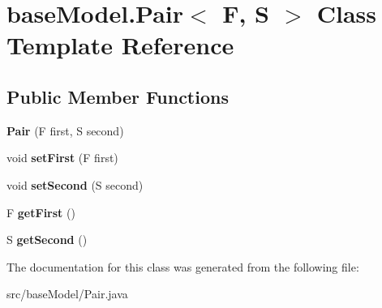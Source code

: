 \hypertarget{classbase_model_1_1_pair}{}\section{base\+Model.\+Pair$<$ F, S $>$ Class Template Reference}
\label{classbase_model_1_1_pair}
\subsection*{Public Member Functions}
\begin{DoxyCompactItemize}
\item 
\hypertarget{classbase_model_1_1_pair_ae46c67c9ec3ecc2b320ec0e24e7f7a21}{}{\bfseries Pair} (F first, S second)\label{classbase_model_1_1_pair_ae46c67c9ec3ecc2b320ec0e24e7f7a21}

\item 
\hypertarget{classbase_model_1_1_pair_a127283b1a2552b95a2cdcdd59161f360}{}void {\bfseries set\+First} (F first)\label{classbase_model_1_1_pair_a127283b1a2552b95a2cdcdd59161f360}

\item 
\hypertarget{classbase_model_1_1_pair_a39d0ce10d58b82d3f4898aca2164630c}{}void {\bfseries set\+Second} (S second)\label{classbase_model_1_1_pair_a39d0ce10d58b82d3f4898aca2164630c}

\item 
\hypertarget{classbase_model_1_1_pair_a7a104cf417cd723444e0ee3b9e9d5a9d}{}F {\bfseries get\+First} ()\label{classbase_model_1_1_pair_a7a104cf417cd723444e0ee3b9e9d5a9d}

\item 
\hypertarget{classbase_model_1_1_pair_a7eb866be73dbaab6229f2ee80ddfe073}{}S {\bfseries get\+Second} ()\label{classbase_model_1_1_pair_a7eb866be73dbaab6229f2ee80ddfe073}

\end{DoxyCompactItemize}


The documentation for this class was generated from the following file\+:\begin{DoxyCompactItemize}
\item 
src/base\+Model/Pair.\+java\end{DoxyCompactItemize}
